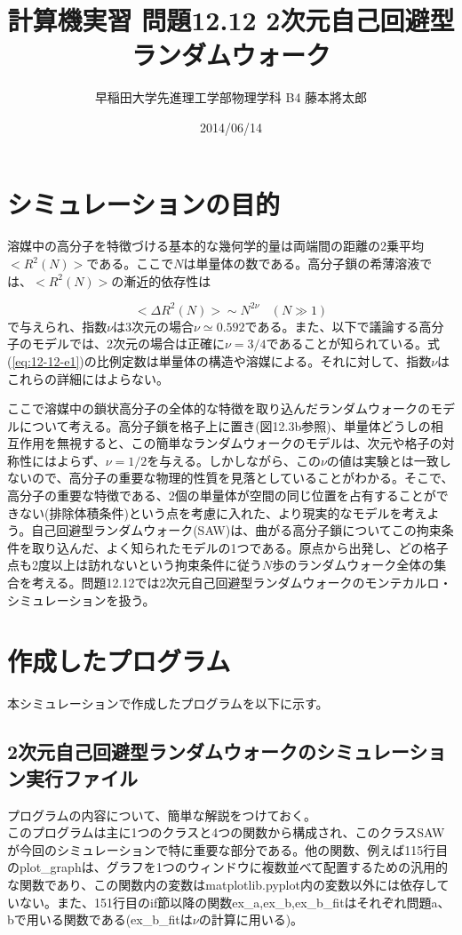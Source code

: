 \documentclass{jsarticle}
\title{計算機実習 問題12.12 2次元自己回避型ランダムウォーク}
\author{早稲田大学先進理工学部物理学科 B4 藤本將太郎}
\date{2014/06/14}
\begin{document}
\maketitle
    
    \section{シミュレーションの目的}
        
        溶媒中の高分子を特徴づける基本的な幾何学的量は両端間の距離の2乗平均$<R^{2}(N)>$である。ここで$N$は単量体の数である。高分子鎖の希薄溶液では、$<R^{2}(N)>$の漸近的依存性は
        
        \begin{equation}
            <\Delta R^{2}(N)> \sim N^{2\nu}\ \ \ \ (N \gg 1)
            \label{eq:12-12-e1}
        \end{equation}
        で与えられ、指数$\nu$は3次元の場合$\nu \simeq 0.592$である。また、以下で議論する高分子のモデルでは、2次元の場合は正確に$\nu=3/4$であることが知られている。式(\ref{eq:12-12-e1})の比例定数は単量体の構造や溶媒による。それに対して、指数$\nu$はこれらの詳細にはよらない。
    
        ここで溶媒中の鎖状高分子の全体的な特徴を取り込んだランダムウォークのモデルについて考える。高分子鎖を格子上に置き(図12.3b参照)、単量体どうしの相互作用を無視すると、この簡単なランダムウォークのモデルは、次元や格子の対称性にはよらず、$\nu=1/2$を与える。しかしながら、この$\nu$の値は実験とは一致しないので、高分子の重要な物理的性質を見落としていることがわかる。そこで、高分子の重要な特徴である、2個の単量体が空間の同じ位置を占有することができない(排除体積条件)という点を考慮に入れた、より現実的なモデルを考えよう。自己回避型ランダムウォーク(SAW)は、曲がる高分子鎖についてこの拘束条件を取り込んだ、よく知られたモデルの1つである。原点から出発し、どの格子点も2度以上は訪れないという拘束条件に従う$N$歩のランダムウォーク全体の集合を考える。問題12.12では2次元自己回避型ランダムウォークのモンテカルロ・シミュレーションを扱う。
        
    \section{作成したプログラム}
        本シミュレーションで作成したプログラムを以下に示す。
    
        \subsection{2次元自己回避型ランダムウォークのシミュレーション実行ファイル}
            プログラムの内容について、簡単な解説をつけておく。\\
            このプログラムは主に1つのクラスと4つの関数から構成され、このクラスSAWが今回のシミュレーションで特に重要な部分である。他の関数、例えば115行目のplot\_graphは、グラフを1つのウィンドウに複数並べて配置するための汎用的な関数であり、この関数内の変数はmatplotlib.pyplot内の変数以外には依存していない。また、151行目のif節以降の関数ex\_a,ex\_b,ex\_b\_fitはそれぞれ問題a、bで用いる関数である(ex\_b\_fitは$\nu$の計算に用いる)。
            
\end{document}
